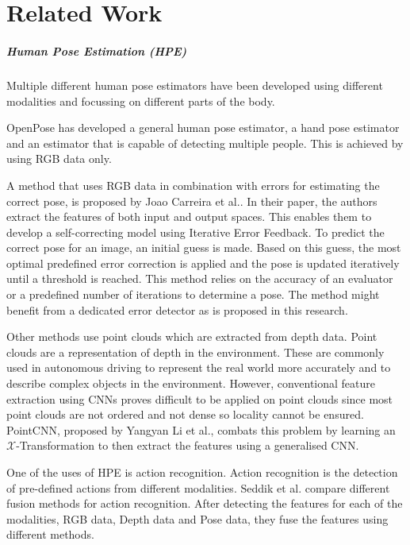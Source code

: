 \chapter{Related Work}
\label{sec:related_work}

\paragraph{Human Pose Estimation (HPE)}

Multiple different human pose estimators have been developed using different modalities and focussing on different parts of the body. 

OpenPose has developed a general human pose estimator\cite{OpenPosePose}, a hand pose estimator\cite{OpenPoseHand} and an estimator that is capable of detecting multiple people\cite{OpenPoseMulti}. This is achieved by using RGB data only.

A method that uses RGB data in combination with errors for estimating the correct pose, is proposed by Joao Carreira et al.\cite{IterativeErrorFeedback}. In their paper, the authors extract the features of both input and output spaces. This enables them to develop a self-correcting model using Iterative Error Feedback. To predict the correct pose for an image, an initial guess is made. Based on this guess, the most optimal predefined error correction is applied and the pose is updated iteratively until a threshold is reached. This method relies on the accuracy of an evaluator or a predefined number of iterations to determine a pose. The method might benefit from a dedicated error detector as is proposed in this research. 

Other methods use point clouds which are extracted from depth data. Point clouds are a representation of depth in the environment. These are commonly used in autonomous driving to represent the real world more accurately and to describe complex objects in the environment. However, conventional feature extraction using CNNs proves difficult to be applied on point clouds since most point clouds are not ordered and not dense so locality cannot be ensured. PointCNN, proposed by Yangyan Li et al.\cite{li2018pointcnn}, combats this problem by learning an $\mathcal{X}$-Transformation to then extract the features using a generalised CNN.


One of the uses of HPE is action recognition. Action recognition is the detection of pre-defined actions from different modalities. Seddik et al. compare different fusion methods for action recognition\cite{Seddik2017}. After detecting the features for each of the modalities, RGB data, Depth data and Pose data, they fuse the features using different methods. 


